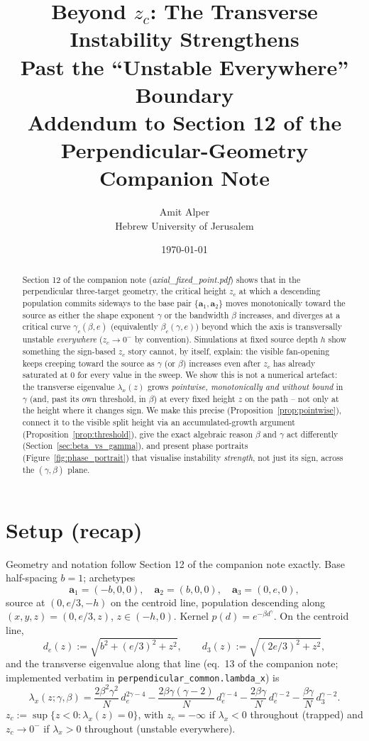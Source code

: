 \documentclass[11pt,a4paper]{article}
\title{\bfseries
Beyond $z_c$: The Transverse Instability Strengthens\\
Past the ``Unstable Everywhere'' Boundary\\
\large Addendum to Section 12 of the Perpendicular-Geometry Companion Note
}
\author{Amit Alper\\
\small Hebrew University of Jerusalem}
\date{\today}
\theoremstyle{plain}
\theoremstyle{definition}
\theoremstyle{remark}
\newcommand{\ba}{\bm{a}}
\newcommand{\lam}{\lambda}
\newcommand{\bw}{\beta}
\newcommand{\bwc}{\beta_c}
\newcommand{\gc}{\gamma_c}
\newcommand{\de}{d_e}
\newcommand{\dth}{d_3}
\begin{document}
\maketitle

\begin{abstract}
Section 12 of the companion note (\emph{axial\_fixed\_point.pdf}) shows that
in the perpendicular three-target geometry, the critical height $z_c$ at
which a descending population commits sideways to the base pair
$\{\ba_1,\ba_2\}$ moves monotonically toward the source as either the shape
exponent $\gamma$ or the bandwidth $\bw$ increases, and diverges at a
critical curve $\gc(\bw,e)$ (equivalently $\bwc(\gamma,e)$) beyond which the
axis is transversally unstable \emph{everywhere} ($z_c\to 0^-$ by
convention). Simulations at fixed source depth $h$ show something the
sign-based $z_c$ story cannot, by itself, explain: the visible fan-opening
keeps creeping toward the source as $\gamma$ (or $\bw$) increases even after
$z_c$ has already saturated at $0$ for every value in the sweep. We show
this is not a numerical artefact: the transverse eigenvalue $\lam_x(z)$
grows \emph{pointwise, monotonically and without bound} in $\gamma$ (and,
past its own threshold, in $\bw$) at every fixed height $z$ on the path --
not only at the height where it changes sign. We make this precise
(Proposition~\ref{prop:pointwise}), connect it to the visible split height
via an accumulated-growth argument (Proposition~\ref{prop:threshold}), give
the exact algebraic reason $\bw$ and $\gamma$ act differently
(Section~\ref{sec:beta_vs_gamma}), and present phase portraits
(Figure~\ref{fig:phase_portrait}) that visualise instability
\emph{strength}, not just its sign, across the $(\gamma,\bw)$ plane.
\end{abstract}

\tableofcontents

\section{Setup (recap)}

Geometry and notation follow Section 12 of the companion note exactly. Base
half-spacing $b=1$; archetypes
\[
\ba_1=(-b,0,0),\quad \ba_2=(b,0,0),\quad \ba_3=(0,e,0),
\]
source at $(0,e/3,-h)$ on the centroid line, population descending along
$(x,y,z)=(0,e/3,z)$, $z\in(-h,0)$. Kernel $p(d)=e^{-\bw d^\gamma}$. On the
centroid line,
\[
\de(z):=\sqrt{b^2+(e/3)^2+z^2},\qquad \dth(z):=\sqrt{(2e/3)^2+z^2},
\]
and the transverse eigenvalue along that line (eq.~13 of the companion
note; implemented verbatim in \texttt{perpendicular\_common.lambda\_x}) is
\begin{equation}
\lam_x(z;\gamma,\bw)
= \frac{2\bw^2\gamma^2}{N}\,\de^{2\gamma-4}
 -\frac{2\bw\gamma(\gamma-2)}{N}\,\de^{\gamma-4}
 -\frac{2\bw\gamma}{N}\,\de^{\gamma-2}
 -\frac{\bw\gamma}{N}\,\dth^{\gamma-2}.
\label{eq:lamx}
\end{equation}
$z_c:=\sup\{z<0:\lam_x(z)=0\}$, with $z_c=-\infty$ if $\lam_x<0$ throughout
(trapped) and $z_c\to 0^-$ if $\lam_x>0$ throughout (unstable everywhere).
\end{document}
